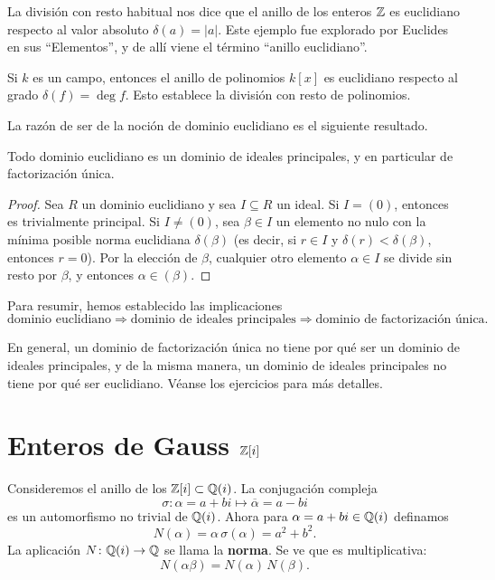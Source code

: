 \begin{ejemplo}
  La división con resto habitual nos dice que el anillo de los enteros $\mathbb{Z}$ es
  euclidiano respecto al valor absoluto $\delta (a) = |a|$. Este ejemplo fue
  explorado por Euclides en sus ``Elementos'', y de allí viene el término
  ``anillo euclidiano''.

  Si $k$ es un campo, entonces el anillo de polinomios $k [x]$ es euclidiano
  respecto al grado $\delta (f) = \deg f$. Esto establece la división con resto
  de polinomios.
\end{ejemplo}

La razón de ser de la noción de dominio euclidiano es el siguiente resultado.

\begin{teorema}
  Todo dominio euclidiano es un dominio de ideales principales, y en particular
  de factorización única.

\begin{proof}
  Sea $R$ un dominio euclidiano y sea $I \subseteq R$ un ideal. Si $I = (0)$,
  entonces es trivialmente principal. Si $I \ne (0)$, sea $\beta\in I$ un
  elemento no nulo con la mínima posible norma euclidiana $\delta (\beta)$
  (es decir, si $r \in I$ y $\delta (r) < \delta (\beta)$, entonces $r = 0$).
  Por la elección de $\beta$, cualquier otro elemento $\alpha \in I$ se divide
  sin resto por $\beta$, y entonces $\alpha \in (\beta)$.
\end{proof}
\end{teorema}

Para resumir, hemos establecido las implicaciones
\[ \text{dominio euclidiano} \Longrightarrow
   \text{dominio de ideales principales} \Longrightarrow
   \text{dominio de factorización única}. \]

En general, un dominio de factorización única no tiene por qué ser un
dominio de ideales principales, y de la misma manera, un dominio de ideales
principales no tiene por qué ser euclidiano. Véanse los ejercicios para
más detalles.


\section{Enteros de Gauss \texorpdfstring{$\mathbb{Z} [i]$}{ℤ[i]}}

Consideremos el anillo de los 
$\mathbb{Z} [i] \subset \mathbb{Q} (i)$. La conjugación compleja
$$\sigma\colon \alpha = a + bi \mapsto \overline{\alpha} = a - bi$$
es un automorfismo no trivial de $\mathbb{Q} (i)$. Ahora para
$\alpha = a + bi \in \mathbb{Q} (i)$ definamos
$$N (\alpha) = \alpha \, \sigma (\alpha) = a^2 + b^2.$$
La aplicación $N\colon \mathbb{Q} (i) \to \mathbb{Q}$ se llama la \textbf{norma}.
Se ve que es multiplicativa:
$$N (\alpha\beta) = N (\alpha) \, N (\beta).$$

